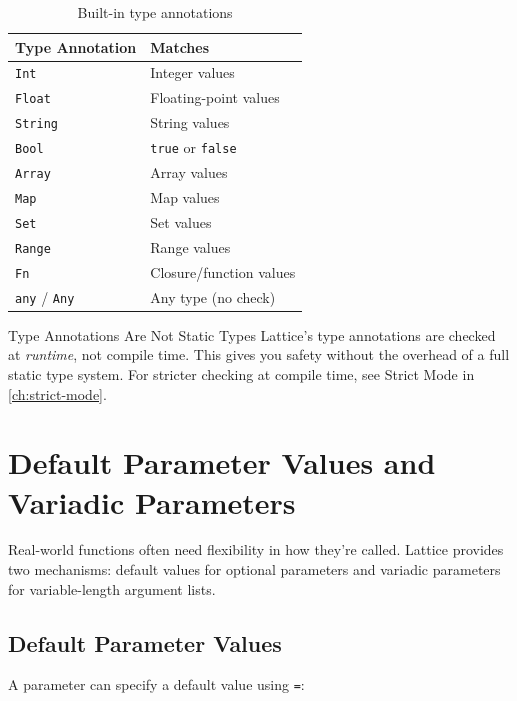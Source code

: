 \begin{table}[ht]
\centering
\begin{tabular}{ll}
\toprule
\textbf{Type Annotation} & \textbf{Matches} \\
\midrule
\lstinline|Int| & Integer values \\
\lstinline|Float| & Floating-point values \\
\lstinline|String| & String values \\
\lstinline|Bool| & \lstinline|true| or \lstinline|false| \\
\lstinline|Array| & Array values \\
\lstinline|Map| & Map values \\
\lstinline|Set| & Set values \\
\lstinline|Range| & Range values \\
\lstinline|Fn| & Closure/function values \\
\lstinline|any| / \lstinline|Any| & Any type (no check) \\
\bottomrule
\end{tabular}
\caption{Built-in type annotations}\label{tab:type-annotations}
\end{table}

\begin{tipbox}{Type Annotations Are Not Static Types}
Lattice's type annotations are checked at \emph{runtime}, not compile time. This gives you safety without the overhead of a full static type system. For stricter checking at compile time, see Strict Mode in \cref{ch:strict-mode}.
\end{tipbox}

\section{Default Parameter Values and Variadic Parameters}\label{sec:defaults-variadics}

Real-world functions often need flexibility in how they're called. Lattice provides two mechanisms: default values for optional parameters and variadic parameters for variable-length argument lists.

\subsection{Default Parameter Values}\label{sec:default-values}

A parameter can specify a default value using \lstinline|=|:

